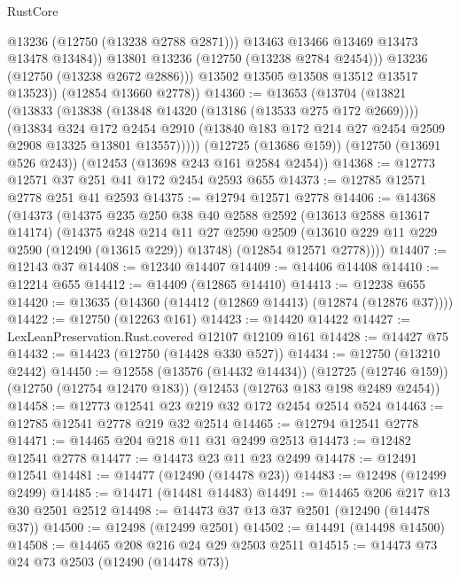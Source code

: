 \begin{lexlean}{RustCore}
\begin{coremodule}
                    @13236
                    (@12750 (@13238 @2788 @2871)))
                  @13463
                  @13466
                  @13469
                  @13473
                  @13478
                  @13484))
              @13801
              @13236
              (@12750 (@13238 @2784 @2454)))
            @13236
            (@12750 (@13238 @2672 @2886)))
          @13502
          @13505
          @13508
          @13512
          @13517
          @13523))
      (@12854 @13660 @2778))
@14360 := @13653
    (@13704
      (@13821
        (@13833
          (@13838 (@13848 @14320 (@13186 (@13533 @275 @172 @2669))))
          (@13834
            @324
            @172
            @2454
            @2910
            (@13840 @183 @172 @214 @27 @2454 @2509 @2908 @13325 @13801 @13557)))))
    (@12725 (@13686 @159))
    (@12750 (@13691 @526 @243))
    (@12453 (@13698 @243 @161 @2584 @2454))
@14368 := @12773 @12571 @37 @251 @41 @172 @2454 @2593 @655
@14373 := @12785 @12571 @2778 @251 @41 @2593
@14375 := @12794 @12571 @2778
@14406 := @14368
    (@14373
      (@14375
        @235
        @250
        @38
        @40
        @2588
        @2592
        (@13613 @2588 @13617 @14174)
        (@14375
          @248
          @214
          @11
          @27
          @2590
          @2509
          (@13610 @229 @11 @229 @2590 (@12490 (@13615 @229)) @13748)
          (@12854 @12571 @2778))))
@14407 := @12143 @37
@14408 := @12340 @14407
@14409 := @14406 @14408
@14410 := @12214 @655
@14412 := @14409 (@12865 @14410)
@14413 := @12238 @655
@14420 := @13635 (@14360 (@14412 (@12869 @14413) (@12874 (@12876 @37))))
@14422 := @12750 (@12263 @161)
@14423 := @14420 @14422
@14427 := LexLeanPreservation.Rust.covered @12107 @12109 @161
@14428 := @14427 @75
@14432 := @14423 (@12750 (@14428 @330 @527))
@14434 := @12750 (@13210 @2442)
@14450 := @12558
    (@13576 (@14432 @14434))
    (@12725 (@12746 @159))
    (@12750 (@12754 @12470 @183))
    (@12453 (@12763 @183 @198 @2489 @2454))
@14458 := @12773 @12541 @23 @219 @32 @172 @2454 @2514 @524
@14463 := @12785 @12541 @2778 @219 @32 @2514
@14465 := @12794 @12541 @2778
@14471 := @14465 @204 @218 @11 @31 @2499 @2513
@14473 := @12482 @12541 @2778
@14477 := @14473 @23 @11 @23 @2499
@14478 := @12491 @12541
@14481 := @14477 (@12490 (@14478 @23))
@14483 := @12498 (@12499 @2499)
@14485 := @14471 (@14481 @14483)
@14491 := @14465 @206 @217 @13 @30 @2501 @2512
@14498 := @14473 @37 @13 @37 @2501 (@12490 (@14478 @37))
@14500 := @12498 (@12499 @2501)
@14502 := @14491 (@14498 @14500)
@14508 := @14465 @208 @216 @24 @29 @2503 @2511
@14515 := @14473 @73 @24 @73 @2503 (@12490 (@14478 @73))

\end{coremodule}
\end{lexlean}
